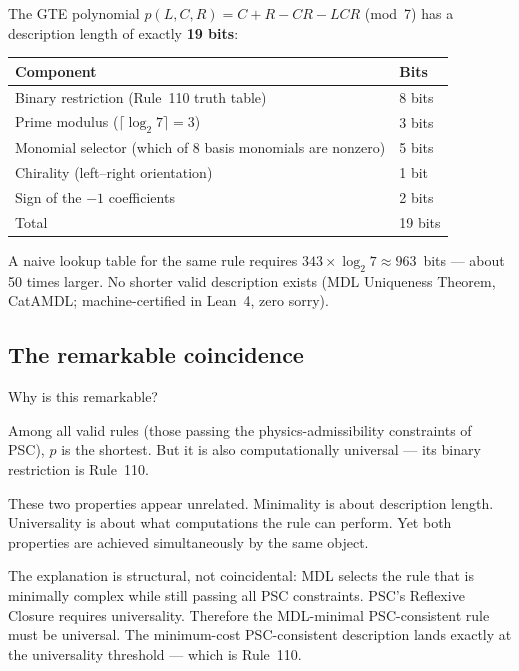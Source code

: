 \documentclass[11pt,a4paper]{article}
\begin{document}
\begin{tcolorbox}[colback=boxgreen,colframe=green!50!black,title=The 19-bit result (CatAMDL)]
The GTE polynomial $p(L,C,R) = C + R - CR - LCR$ (mod~7) has a description length of
exactly \textbf{19 bits}:
\begin{center}
\begin{tabular}{ll}
\toprule
Component & Bits \\
\midrule
Binary restriction (Rule~110 truth table) & 8 bits \\
Prime modulus ($\lceil\log_2 7 \rceil = 3$) & 3 bits \\
Monomial selector (which of 8 basis monomials are nonzero) & 5 bits \\
Chirality (left--right orientation) & 1 bit \\
Sign of the $-1$ coefficients & 2 bits \\
\midrule
Total & 19 bits \\
\bottomrule
\end{tabular}
\end{center}
A naive lookup table for the same rule requires $343 \times \log_2 7 \approx 963$~bits
— about 50 times larger.  No shorter valid description exists (MDL Uniqueness Theorem,
CatAMDL; machine-certified in Lean~4, zero sorry).
\end{tcolorbox}

\subsection{The remarkable coincidence}

Why is this remarkable?

Among all valid rules (those passing the physics-admissibility constraints of PSC),
$p$ is the shortest.  But it is also computationally universal — its binary restriction
is Rule~110.

These two properties appear unrelated.  Minimality is about description length.
Universality is about what computations the rule can perform.  Yet both properties are
achieved simultaneously by the same object.

The explanation is structural, not coincidental: MDL selects the rule that is
minimally complex while still passing all PSC constraints.  PSC's Reflexive Closure
requires universality.  Therefore the MDL-minimal PSC-consistent rule must be
universal.  The minimum-cost PSC-consistent description lands exactly at the
universality threshold — which is Rule~110.
\end{document}
